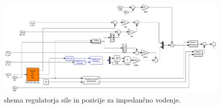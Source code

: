 \begin{figure}[!h]
	\centering
	\includegraphics[trim={0 0cm 0 0cm},scale=0.25]{./Slike/impedance_control.png}
	\caption{\simulink shema regulatorja sile in pozicije za impedan\v{c}no vodenje.}
	\label{fig:impedance_control_sim}
\end{figure}
